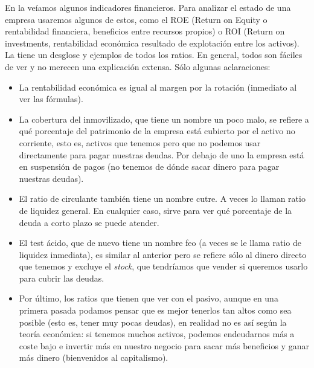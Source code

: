 \documentclass[nochap,palatino,notitlepage]{apuntes}
\begin{document}
En la  veíamos algunos indicadores financieros. Para analizar el estado de una empresa usaremos algunos de estos, como el ROE (Return on Equity o rentabilidad financiera, beneficios entre recursos propios) o ROI (Return on investments, rentabilidad económica resultado de explotación entre los activos). La  tiene un desglose y ejemplos de todos los ratios. En general, todos son fáciles de ver y no merecen una explicación extensa. Sólo algunas aclaraciones:

\begin{itemize}
\item La rentabilidad económica es igual al margen por la rotación (inmediato al ver las fórmulas).
\item La cobertura del inmovilizado, que tiene un nombre un poco malo, se refiere a qué porcentaje del patrimonio de la empresa está cubierto por el activo no corriente, esto es, activos que tenemos pero que no podemos usar directamente para pagar nuestras deudas. Por debajo de uno la empresa está en suspensión de pagos (no tenemos de dónde sacar dinero para pagar nuestras deudas).
\item El ratio de circulante también tiene un nombre cutre. A veces lo llaman ratio de liquidez general. En cualquier caso, sirve para ver qué porcentaje de la deuda a corto plazo se puede atender.
\item El test ácido, que de nuevo tiene un nombre feo (a veces se le llama ratio de liquidez inmediata), es similar al anterior pero se refiere sólo al dinero directo que tenemos y excluye el \textit{stock}, que tendríamos que vender si queremos usarlo para cubrir las deudas.
\item Por último, los ratios que tienen que ver con el pasivo, aunque en una primera pasada podamos pensar que es mejor tenerlos tan altos como sea posible (esto es, tener muy pocas deudas), en realidad no es así según la teoría económica: si tenemos muchos activos, podemos endeudarnos más a coste bajo e invertir más en nuestro negocio para sacar más beneficios y ganar más dinero (bienvenidos al capitalismo).
\end{itemize}
\end{document}
